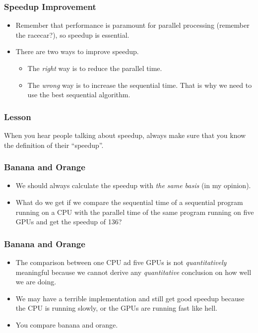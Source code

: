 \documentclass{beamer}
\begin{document}
\begin{CJK}{UTF8}{bsmi}
\begin{frame}
\frametitle{Speedup Improvement}
\begin{itemize}
\item Remember that performance is paramount for parallel processing
  (remember the racecar?), so speedup is essential.
\item There are two ways to improve speedup.
\begin{itemize}
\item The {\em right} way is to reduce the parallel time.
\item The {\em wrong} way is to increase the sequential time.  That is why
  we need to use the best sequential algorithm.
\end{itemize}
\end{itemize}
\end{frame}

\begin{frame}
\frametitle{Lesson} \huge When you hear people talking about speedup,
always make sure that you know the definition of their ``speedup''.
\end{frame}

\begin{frame}
\frametitle{Banana and Orange}
\begin{itemize}
\item We should always calculate the speedup with {\em the same basis} (in my opinion).
\item What do we get if we compare the sequential time of a sequential program running on a CPU with the parallel time of the same program running on five GPUs and get the speedup of 136?
\end{itemize}
\end{frame}

\begin{frame}
\frametitle{Banana and Orange}
\begin{itemize}
\item The comparison between one CPU ad five GPUs is not {\em quantitatively} meaningful because we cannot derive any {\em quantitative} conclusion on how well we are doing.
\item We may have a terrible implementation and still get good speedup because the CPU is running slowly, or the GPUs are running fast like hell.
\item You compare banana and orange.
\end{itemize}
\end{frame}


\end{CJK}
\end{document}
